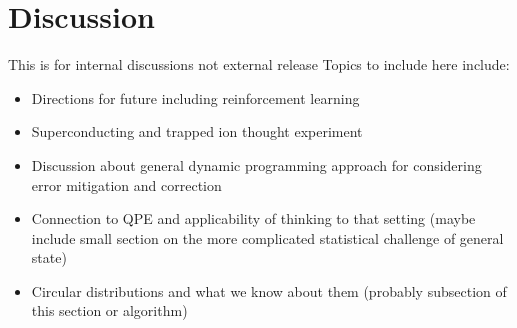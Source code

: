 \section{Discussion}
This is for internal discussions not external release
Topics to include here include:
\begin{itemize}
	\item Directions for future including reinforcement learning
	\item Superconducting and trapped ion thought experiment
	\item Discussion about general dynamic programming approach for considering error mitigation and correction
	\item Connection to QPE and applicability of thinking to that setting (maybe include small section on the more complicated statistical challenge of general state)
	\item Circular distributions and what we know about them (probably subsection of this section or algorithm)
\end{itemize}

\newpage
